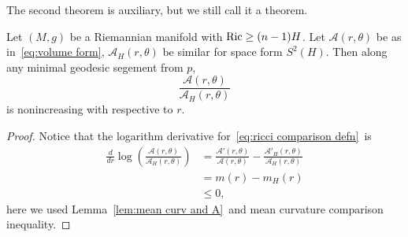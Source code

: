 The second theorem is auxiliary, but we still call it a theorem.

\begin{thm}\label{thm:Ricci comparison}
    Let $(M,g)$ be a Riemannian manifold with $\operatorname{Ric}\geq(n-1)H$.
    Let $\mathcal{A}(r,\theta)$ be as in~\eqref{eq:volume form}, $\mathcal{A}_H(r,\theta)$ be similar for space form $S^2(H)$.
    Then along any minimal geodesic segement from $p$,
    \begin{equation}
        \frac{\mathcal{A}(r,\theta)}{\mathcal{A}_H(r,\theta)}\label{eq:ricci comparison defn}
    \end{equation}
    is nonincreasing with respective to $r$.
\end{thm}
\begin{proof}
    Notice that the logarithm derivative for~\eqref{eq:ricci comparison defn}~is
    \begin{align*}
        \frac{d}{dr}\log\left(\frac{\mathcal{A}(r,\theta)}{\mathcal{A}_H(r,\theta)}\right)&=\frac{\mathcal{A}'(r,\theta)}{\mathcal{A}(r,\theta)}-\frac{\mathcal{A}'_H(r,\theta)}{\mathcal{A}_H(r,\theta)}\\
        &=m(r)-m_H(r)\\
        &\leq 0,
    \end{align*}
    here we used Lemma~\ref{lem:mean curv and A}~and mean curvature comparison inequality.
\end{proof}

